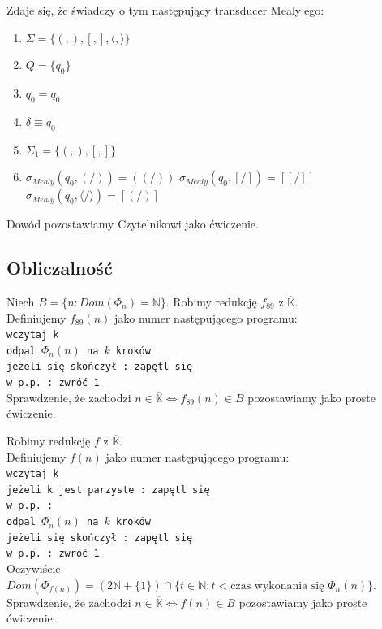 \documentclass[a4paper,11pt]{article}
\newenvironment{zadanie}[1]
  {\renewcommand\theinnercustomthm{#1}\innercustomthm}
  {\endinnercustomthm}
\begin{document}
\begin{zadanie}{80}
\end{zadanie}
Zdaje się, że świadczy o tym następujący transducer Mealy'ego:
\begin{enumerate}
 \item $\Sigma = \{(,),[,],\langle,\rangle \}$
 \item $Q = \{q_0\}$
 \item $q_0 = q_0$
 \item $\delta \equiv q_0$
 \item $\Sigma_1 = \{(,),[,] \}$
 \item
 \subitem $\sigma_{Mealy}( q_0, (/) ) = ((/)) $
 \subitem $\sigma_{Mealy}( q_0, [/] ) = [[/]] $
 \subitem $\sigma_{Mealy}( q_0, \langle / \rangle ) = [(/)] $
\end{enumerate}
Dowód pozostawiamy Czytelnikowi jako ćwiczenie. 

\subsection{Obliczalność}

\begin{zadanie}{89}
\end{zadanie}
Niech $B = \{ n : Dom(\Phi_n) = \mathbb{N} \}$. Robimy redukcję $f_{89}$ z $\overline{\mathbb{K}}$. \\
Definiujemy $f_{89}(n)$ jako numer następującego programu: \\
\texttt{wczytaj k  \\ odpal $\Phi_n(n)$ na $k$ kroków \\ jeżeli się skończył : zapętl się \\ w p.p. : zwróć 1 \\}
Sprawdzenie, że zachodzi $n \in \overline{\mathbb{K}} \Longleftrightarrow f_{89}(n) \in B$ pozostawiamy jako proste ćwiczenie.



\begin{zadanie}{92}
\end{zadanie}
Robimy redukcję $f$ z $\overline{\mathbb{K}}$. \\
Definiujemy $f(n)$ jako numer następującego programu: \\
\texttt{wczytaj k \\ jeżeli k jest parzyste : zapętl się  \\ w p.p. : \\ odpal $\Phi_n(n)$ na $k$ kroków \\ jeżeli się skończył : zapętl się \\ w p.p. : zwróć 1 \\}
Oczywiście $Dom(\Phi_{f(n)}) = (2\mathbb{N}+\{1\}) \cap \{ t \in \mathbb{N} : t < \text{czas wykonania się } \Phi_n(n) \}$. \\
Sprawdzenie, że zachodzi $n \in \overline{\mathbb{K}} \Longleftrightarrow f(n) \in B$ pozostawiamy jako proste ćwiczenie.
\end{document}
